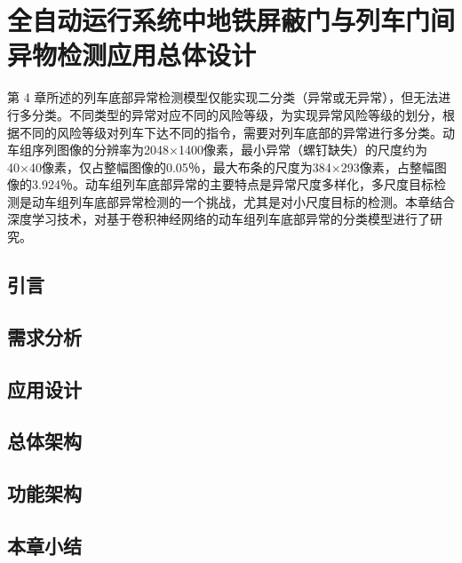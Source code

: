 \chapter{全自动运行系统中地铁屏蔽门与列车门间异物检测应用总体设计}
第 4 章所述的列车底部异常检测模型仅能实现二分类（异常或无异常），但无法进行多分类。不同类型的异常对应不同的风险等级，为实现异常风险等级的划分，根据不同的风险等级对列车下达不同的指令，需要对列车底部的异常进行多分类。动车组序列图像的分辨率为2048×1400像素，最小异常（螺钉缺失）的尺度约为40×40像素，仅占整幅图像的0.05％，最大布条的尺度为384×293像素，占整幅图像的3.924％。动车组列车底部异常的主要特点是异常尺度多样化，多尺度目标检测是动车组列车底部异常检测的一个挑战，尤其是对小尺度目标的检测。本章结合深度学习技术，对基于卷积神经网络的动车组列车底部异常的分类模型进行了研究。
\section{引言}
\section{需求分析}
\section{应用设计}
\section{总体架构}
\section{功能架构}
\section{本章小结}